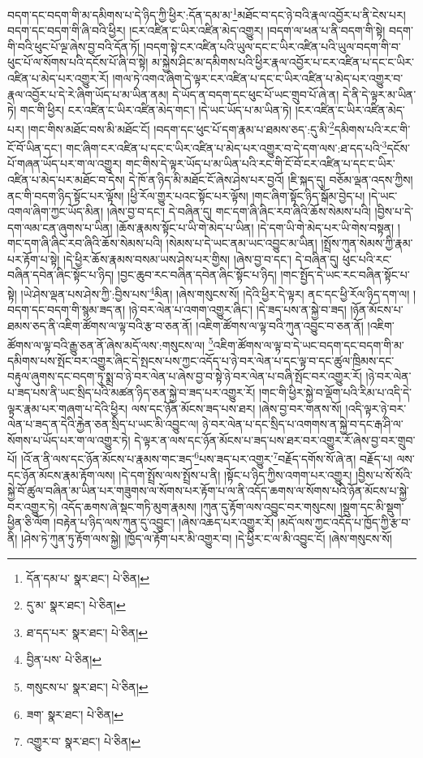 བདག་དང་བདག་གི་མ་དམིགས་པ་དེ་ཉིད་ཀྱི་ཕྱིར་:དོན་དམ་མ་\footnote{དོན་དམ་པ་  སྣར་ཐང་།  པེ་ཅིན། }མཐོང་བ་དང་ཉེ་བའི་རྣལ་འབྱོར་པ་ནི་ངེས་པར། བདག་དང་བདག་གི་ཞི་བའི་ཕྱིར། །ངར་འཛིན་ང་ཡིར་འཛིན་མེད་འགྱུར། །བདག་ལ་ཕན་པ་ནི་བདག་གི་སྟེ། བདག་གི་བའི་ཕུང་པོ་ལྔ་ཞེས་བྱ་བའི་དོན་ཏོ། །བདག་སྟེ་ངར་འཛིན་པའི་ཡུལ་དང་ང་ཡིར་འཛིན་པའི་ཡུལ་བདག་གི་བ་ཕུང་པོ་ལ་སོགས་པའི་དངོས་པོ་ཞི་བ་སྟེ། མ་སྐྱེས་ཤིང་མ་དམིགས་པའི་ཕྱིར་རྣལ་འབྱོར་པ་ངར་འཛིན་པ་དང་ང་ཡིར་འཛིན་པ་མེད་པར་འགྱུར་རོ། །གལ་ཏེ་འགའ་ཞིག་དེ་ལྟར་ངར་འཛིན་པ་དང་ང་ཡིར་འཛིན་པ་མེད་པར་འགྱུར་བ་རྣལ་འབྱོར་པ་དེ་རེ་ཞིག་ཡོད་པ་མ་ཡིན་ནམ། དེ་ཡོད་ན་བདག་དང་ཕུང་པོ་ཡང་གྲུབ་པོ་ཞེ་ན། དེ་ནི་དེ་ལྟར་མ་ཡིན་ཏེ། གང་གི་ཕྱིར། ངར་འཛིན་ང་ཡིར་འཛིན་མེད་གང་། །དེ་ཡང་ཡོད་པ་མ་ཡིན་ཏེ། །ངར་འཛིན་ང་ཡིར་འཛིན་མེད་པར། །གང་གིས་མཐོང་བས་མི་མཐོང་ངོ། །བདག་དང་ཕུང་པོ་དག་རྣམ་པ་ཐམས་ཅད་:དུ་མི་\footnote{དུ་མ་  སྣར་ཐང་།  པེ་ཅིན། }དམིགས་པའི་རང་གི་ངོ་བོ་ཡིན་དང་། གང་ཞིག་ངར་འཛིན་པ་དང་ང་ཡིར་འཛིན་པ་མེད་པར་འགྱུར་བ་དེ་དག་ལས་:ཐ་དད་པའི་\footnote{ཐ་དད་པར་  སྣར་ཐང་།  པེ་ཅིན། }དངོས་པོ་གཞན་ཡོད་པར་ག་ལ་འགྱུར། གང་གིས་དེ་ལྟར་ཡོད་པ་མ་ཡིན་པའི་རང་གི་ངོ་བོ་ངར་འཛིན་པ་དང་ང་ཡིར་འཛིན་པ་མེད་པར་མཐོང་བ་དེས། དེ་ཁོ་ན་ཉིད་མི་མཐོང་ངོ་ཞེས་ཤེས་པར་བྱའོ། །ཇི་སྐད་དུ། བཅོམ་ལྡན་འདས་ཀྱིས། ནང་གི་བདག་ཉིད་སྟོང་པར་ལྟོས། །ཕྱི་རོལ་གྱུར་པའང་སྟོང་པར་ལྟོས། །གང་ཞིག་སྟོང་ཉིད་སྒོམ་བྱེད་པ། །དེ་ཡང་འགལ་ཞིག་ཀྱང་ཡོད་མིན། །ཞེས་བྱ་བ་དང་། དེ་བཞིན་དུ། གང་དག་ཞི་ཞིང་རབ་ཞིའི་ཆོས་སེམས་པའི། །བྱིས་པ་དེ་དག་ལམ་ངན་ཞུགས་པ་ཡིན། །ཆོས་རྣམས་སྟོང་པ་ཡི་གེ་མེད་པ་ཡིན། །དེ་དག་ཡི་གེ་མེད་པར་ཡི་གེས་བསྟན། །གང་དག་ཞི་ཞིང་རབ་ཞིའི་ཆོས་སེམས་པའི། །སེམས་པ་དེ་ཡང་ནམ་ཡང་འབྱུང་མ་ཡིན། །སྤྲོས་ཀུན་སེམས་ཀྱི་རྣམ་པར་རྟོག་པ་སྟེ། །དེ་ཕྱིར་ཆོས་རྣམས་བསམ་ཡས་ཤེས་པར་གྱིས། །ཞེས་བྱ་བ་དང་། དེ་བཞིན་དུ། ཕུང་པའི་རང་བཞིན་དབེན་ཞིང་སྟོང་པ་ཉིད། །བྱང་ཆུབ་རང་བཞིན་དབེན་ཞིང་སྟོང་པ་ཉིད། །གང་སྤྱོད་དེ་ཡང་རང་བཞིན་སྟོང་པ་སྟེ། །ཡེ་ཤེས་ལྡན་པས་ཤེས་ཀྱི་:བྱིས་པས་\footnote{བྱིན་པས་  པེ་ཅིན། }མིན། །ཞེས་གསུངས་སོ། །དེའི་ཕྱིར་དེ་ལྟར། ནང་དང་ཕྱི་རོལ་ཉིད་དག་ལ། །བདག་དང་བདག་གི་སྙམ་ཟད་ན། །ཉེ་བར་ལེན་པ་འགག་འགྱུར་ཞིང་། །དེ་ཟད་པས་ན་སྐྱེ་བ་ཟད། །ཉོན་མོངས་པ་ཐམས་ཅད་ནི་འཇིག་ཚོགས་ལ་ལྟ་བའི་རྩ་བ་ཅན་ནོ། །འཇིག་ཚོགས་ལ་ལྟ་བའི་ཀུན་འབྱུང་བ་ཅན་ནོ། །འཇིག་ཚོགས་ལ་ལྟ་བའི་རྒྱུ་ཅན་ནོ་ཞེས་མདོ་ལས་:གསུངས་ལ། \footnote{གསུངས་པ་  སྣར་ཐང་།  པེ་ཅིན། }འཇིག་ཚོགས་ལ་ལྟ་བ་དེ་ཡང་བདག་དང་བདག་གི་མ་དམིགས་པས་སྤོང་བར་འགྱུར་ཞིང་དེ་སྤངས་པས་ཀྱང་འདོད་པ་ཉེ་བར་ལེན་པ་དང་ལྟ་བ་དང་ཚུལ་ཁྲིམས་དང་བརྟུལ་ཞུགས་དང་བདག་ཏུ་སྨྲ་བ་ཉེ་བར་ལེན་པ་ཞེས་བྱ་བ་སྟེ་ཉེ་བར་ལེན་པ་བཞི་སྤོང་བར་འགྱུར་རོ། །ཉེ་བར་ལེན་པ་ཟད་པས་ནི་ཡང་སྲིད་པའི་མཚན་ཉིད་ཅན་སྐྱེ་བ་ཟད་པར་འགྱུར་རོ། །གང་གི་ཕྱིར་སྐྱེ་བ་ལྡོག་པའི་རིམ་པ་འདི་དེ་ལྟར་རྣམ་པར་གཞག་པ་དེའི་ཕྱིར། ལས་དང་ཉོན་མོངས་ཟད་པས་ཐར། །ཞེས་བྱ་བར་གནས་སོ། །འདི་ལྟར་ཉེ་བར་ལེན་པ་ཟད་ན་དེའི་རྐྱེན་ཅན་སྲིད་པ་ཡང་མི་འབྱུང་ལ། ཉེ་བར་ལེན་པ་དང་སྲིད་པ་འགགས་ན་སྐྱེ་བ་དང་རྒ་ཤི་ལ་སོགས་པ་ཡོད་པར་ག་ལ་འགྱུར་ཏེ། དེ་ལྟར་ན་ལས་དང་ཉོན་མོངས་པ་ཟད་པས་ཐར་བར་འགྱུར་རོ་ཞེས་བྱ་བར་གྲུབ་པོ། །འོ་ན་ནི་ལས་དང་ཉོན་མོངས་པ་རྣམས་གང་ཟད་\footnote{ཟག་  སྣར་ཐང་།  པེ་ཅིན། }པས་ཟད་པར་འགྱུར་\footnote{འགྱུར་བ་  སྣར་ཐང་།  པེ་ཅིན། }བརྗོད་དགོས་སོ་ཞེ་ན། བརྗོད་པ། ལས་དང་ཉོན་མོངས་རྣམ་རྟོག་ལས། །དེ་དག་སྤྲོས་ལས་སྤྲོས་པ་ནི། །སྟོང་པ་ཉིད་ཀྱིས་འགག་པར་འགྱུར། །བྱིས་པ་སོ་སོའི་སྐྱེ་བོ་ཚུལ་བཞིན་མ་ཡིན་པར་གཟུགས་ལ་སོགས་པར་རྟོག་པ་ལ་ནི་འདོད་ཆགས་ལ་སོགས་པའི་ཉོན་མོངས་པ་སྐྱེ་བར་འགྱུར་ཏེ། འདོད་ཆགས་ཞེ་སྡང་གཏི་མུག་རྣམས། །ཀུན་དུ་རྟོག་ལས་འབྱུང་བར་གསུངས། །སྡུག་དང་མི་སྡུག་ཕྱིན་ཅི་ལོག །བརྟེན་པ་ཉིད་ལས་ཀུན་དུ་འབྱུང་། །ཞེས་འཆད་པར་འགྱུར་རོ། །མདོ་ལས་ཀྱང་འདོད་པ་ཁྱོད་ཀྱི་རྩ་བ་ནི། །ཤེས་ཏེ་ཀུན་ཏུ་རྟོག་ལས་སྐྱེ། །ཁྱོད་ལ་རྟོག་པར་མི་འགྱུར་བ། །དེ་ཕྱིར་ང་ལ་མི་འབྱུང་ངོ། །ཞེས་གསུངས་སོ། 
